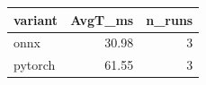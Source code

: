 \begin{tabular}{lrr}
\toprule
variant & AvgT\_ms & n\_runs \\
\midrule
onnx & 30.98 & 3 \\
pytorch & 61.55 & 3 \\
\bottomrule
\end{tabular}
